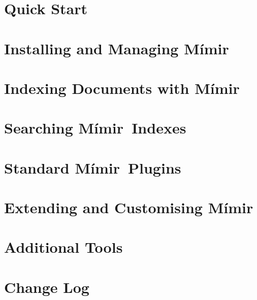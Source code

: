 \documentclass[10pt, a4paper, twoside]{report}
\newcommand{\Mimir}{M\'{i}mir}
\begin{document}
\chapter{Quick Start}\label{sec:quickstart}


\chapter{Installing and Managing \Mimir}\label{sec:admin}

\chapter{Indexing Documents with \Mimir}\label{sec:indexing}

\chapter{Searching \Mimir\ Indexes}\label{sec:searching}

\chapter{Standard \Mimir\ Plugins}\label{sec:plugins}

\chapter{Extending and Customising \Mimir}\label{sec:extend}

\chapter{Additional Tools}\label{sec:tools}


\appendix
\chapter{Change Log}\label{sec:changes}

\end{document}
